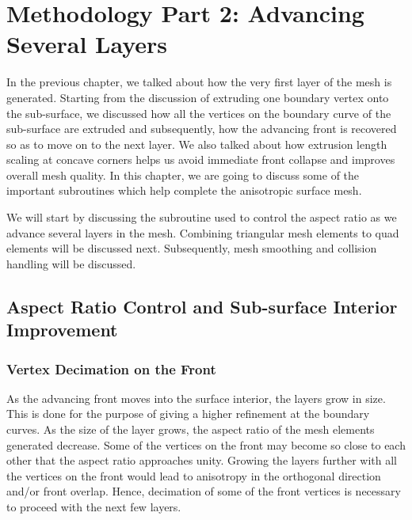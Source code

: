 \chapter{Methodology Part 2: Advancing Several Layers}

In the previous chapter, we talked about how the very first layer of the mesh is generated. Starting from the discussion of extruding one boundary vertex onto the sub-surface, we discussed how all the vertices on the boundary curve of the sub-surface are extruded and subsequently, how the advancing front is recovered so as to move on to the next layer. We also talked about how extrusion length scaling at concave corners helps us avoid immediate front collapse and improves overall mesh quality. In this chapter, we are going to discuss some of the important subroutines which help complete the anisotropic surface mesh.

We will start by discussing the subroutine used to control the aspect ratio as we advance several layers in the mesh. Combining triangular mesh elements to quad elements will be discussed next. Subsequently, mesh smoothing and collision handling will be discussed.

\section{Aspect Ratio Control and Sub-surface Interior Improvement}

\subsection{Vertex Decimation on the Front}
\label{aspectRatioControl}

As the advancing front moves into the surface interior, the layers grow in size. This is done for the purpose of giving a higher refinement at the boundary curves. As the size of the layer grows, the aspect ratio of the mesh elements generated decrease. Some of the vertices on the front may become so close to each other that the aspect ratio approaches unity. Growing the layers further with all the vertices on the front would lead to anisotropy in the orthogonal direction  and/or front overlap. Hence, decimation of some of the front vertices is necessary to proceed with the next few layers.


